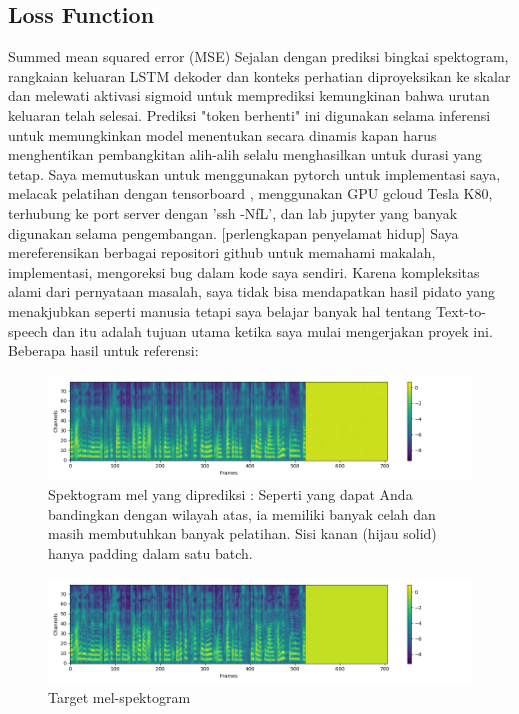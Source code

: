 \subsection{Loss Function}
Summed mean squared error (MSE)
Sejalan dengan prediksi bingkai spektogram, rangkaian keluaran LSTM dekoder dan konteks perhatian diproyeksikan ke skalar dan melewati aktivasi sigmoid untuk memprediksi kemungkinan bahwa urutan keluaran telah selesai. Prediksi "token berhenti" ini digunakan selama inferensi untuk memungkinkan model menentukan secara dinamis kapan harus menghentikan pembangkitan alih-alih selalu menghasilkan untuk durasi yang tetap.
Saya memutuskan untuk menggunakan pytorch untuk implementasi saya, melacak pelatihan dengan tensorboard , menggunakan GPU gcloud Tesla K80, terhubung ke port server dengan 'ssh -NfL', dan lab jupyter yang banyak digunakan selama pengembangan. [perlengkapan penyelamat hidup]
Saya mereferensikan berbagai repositori github untuk memahami makalah, implementasi, mengoreksi bug dalam kode saya sendiri. Karena kompleksitas alami dari pernyataan masalah, saya tidak bisa mendapatkan hasil pidato yang menakjubkan seperti manusia tetapi saya belajar banyak hal tentang Text-to-speech dan itu adalah tujuan utama ketika saya mulai mengerjakan proyek ini.
Beberapa hasil untuk referensi:
\begin{figure}[H]
        \centerline{\includegraphics[scale=.35]{figures/ref1}}
        \caption{Spektogram mel yang diprediksi : Seperti yang dapat Anda bandingkan dengan wilayah atas, ia memiliki banyak celah dan masih membutuhkan banyak pelatihan. Sisi kanan (hijau solid) hanya padding dalam satu batch.}
		\label{ref1}
\end{figure}
\begin{figure}[H]
        \centerline{\includegraphics[scale=.35]{figures/ref2}}
        \caption{Target mel-spektogram}
		\label{ref2}
\end{figure}
